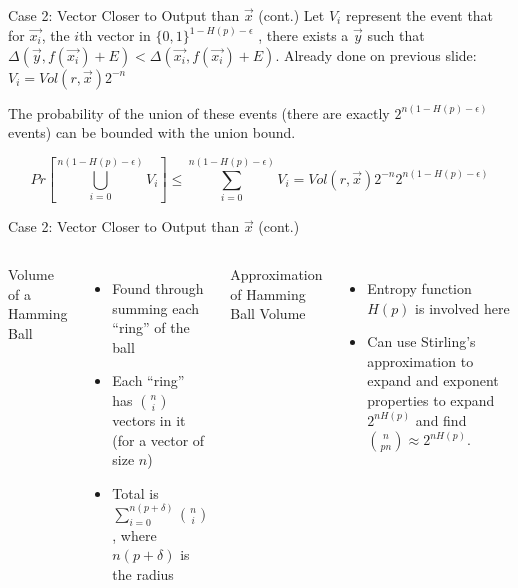 \documentclass[aspectratio=169]{beamer}
\begin{document}
      \begin{frame}[fragile]{Case 2: Vector Closer to Output than $\vec{x}$ (cont.)}
        Let $V_{i}$ represent the event that for $\vec{x_{i}}$, the $i$th vector in $\{0, 1\}^{1-H(p)-\epsilon}$ , there exists a $\vec{y}$ such that $\Delta(\vec{y}, f(\vec{x_{i}}) + E) < \Delta(\vec{x_{i}}, f(\vec{x_{i}}) + E)$. Already done on previous slide: $V_{i} = Vol(r, \vec{x})2^{-n}$
        \newline

        The probability of the union of these events (there are exactly $2^{n(1-H(p)-\epsilon)}$ events) can be bounded with the union bound.

        \[ Pr\left[\bigcup_{i=0}^{n(1-H(p)-\epsilon)} V_{i}\right] \le \sum_{i=0}^{n(1-H(p)-\epsilon)}V_{i} = Vol(r, \vec{x})2^{-n}2^{n(1-H(p)-\epsilon)}  \]
        \end{frame}
      \begin{frame}[fragile]{Case 2: Vector Closer to Output than $\vec{x}$ (cont.)}
        \begin{columns}
          \caption{Volume of a Hamming Ball}
          \begin{itemize}
                  \item Found through summing each ``ring'' of the ball
                  \item Each ``ring'' has $\binom{n}{i}$ vectors in it (for a vector of size $n$)
            \item Total is $\sum_{i=0}^{n(p+\delta)} \binom{n}{i}$, where $n(p+\delta)$ is the radius
                  \end{itemize}
            \caption{Approximation of Hamming Ball Volume}
            \begin{itemize}
                    \item Entropy function $H(p)$ is involved here
                    \item Can use Stirling's approximation to expand and exponent properties to expand $2^{nH(p)}$ and find $\binom{n}{pn} \approx 2^{nH(p)}$.
                    \end{itemize}
          \end{columns}
        \end{frame}
\end{document}
